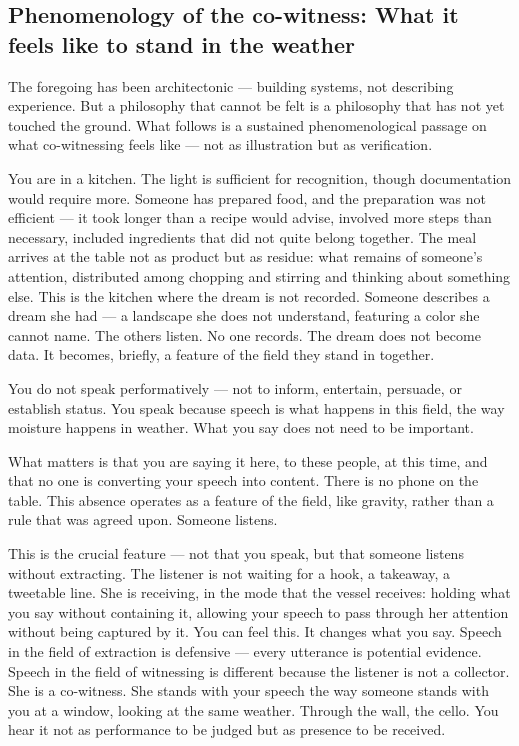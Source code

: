 \subsection{Phenomenology of the co-witness: What it feels like to stand in the weather}

The foregoing has been architectonic — building systems, not describing experience. But a philosophy that cannot be felt is a philosophy that has not yet touched the ground. What follows is a sustained phenomenological passage on what co-witnessing feels like — not as illustration but as verification.

You are in a kitchen. The light is sufficient for recognition, though documentation would require more. Someone has prepared food, and the preparation was not efficient — it took longer than a recipe would advise, involved more steps than necessary, included ingredients that did not quite belong together. The meal arrives at the table not as product but as residue: what remains of someone's attention, distributed among chopping and stirring and thinking about something else. This is the kitchen where the dream is not recorded. Someone describes a dream she had — a landscape she does not understand, featuring a color she cannot name. The others listen. No one records. The dream does not become data. It becomes, briefly, a feature of the field they stand in together.

You do not speak performatively — not to inform, entertain, persuade, or establish status. You speak because speech is what happens in this field, the way moisture happens in weather. What you say does not need to be important.

What matters is that you are saying it here, to these people, at this time, and that no one is converting your speech into content. There is no phone on the table. This absence operates as a feature of the field, like gravity, rather than a rule that was agreed upon. Someone listens.

This is the crucial feature — not that you speak, but that someone listens without extracting. The listener is not waiting for a hook, a takeaway, a tweetable line. She is receiving, in the mode that the vessel receives: holding what you say without containing it, allowing your speech to pass through her attention without being captured by it. You can feel this. It changes what you say. Speech in the field of extraction is defensive — every utterance is potential evidence. Speech in the field of witnessing is different because the listener is not a collector. She is a co-witness. She stands with your speech the way someone stands with you at a window, looking at the same weather. Through the wall, the cello. You hear it not as performance to be judged but as presence to be received.

